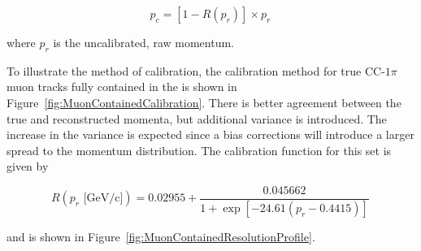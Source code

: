 \begin{equation}\label{eqn:momentumcalibration}
    p_c = [1 - R(p_r)] \times p_r\,
\end{equation}

\noindent{}where $p_r$ is the uncalibrated, raw momentum.

To illustrate the method of calibration, the calibration method for true CC-$1\pi$ muon tracks fully contained in the \podtext{}
is shown in Figure~\ref{fig:MuonContainedCalibration}.
There is better agreement between the true and reconstructed momenta, but additional variance is introduced.
The increase in the variance is expected since a bias corrections will introduce a larger spread to the momentum
distribution. The calibration function for this set is given by

\begin{equation*}
    R(p_{r}\text{\ [GeV/c]}) =  0.02955 + \frac{0.045662}{1+\exp\left[-24.61\left(p_r-0.4415\right)\right]}\,
\end{equation*}

\noindent{}and is shown in Figure~\ref{fig:MuonContainedResolutionProfile}.

